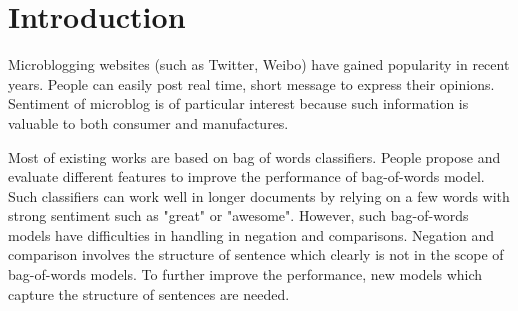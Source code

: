 \section{Introduction}

Microblogging websites (such as Twitter, Weibo) have gained popularity in recent years. People can easily post real time, short message to express their opinions. 
Sentiment of microblog is of particular interest because such information is valuable to both consumer and
manufactures.

Most of existing works are based on bag of words classifiers. People propose and evaluate different features to improve the performance of bag-of-words model. Such classifiers can work well in longer documents by relying on a few words with strong sentiment such as "great" or "awesome". However, such bag-of-words models have difficulties in handling in negation and comparisons. Negation and comparison involves the structure of sentence which clearly is not in the scope of bag-of-words models. To further improve the performance, new models which capture the structure of sentences are needed. 